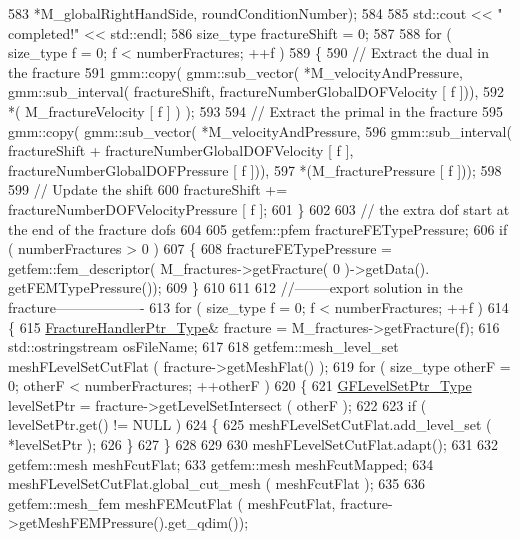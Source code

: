 \begin{DoxyCode}
583                   *M\_globalRightHandSide, roundConditionNumber);
584 
585     std::cout << \textcolor{stringliteral}{" completed!"} << std::endl;
586     size\_type fractureShift = 0;
587 
588     \textcolor{keywordflow}{for} ( size\_type f = 0; f < numberFractures; ++f )
589     \{ 
590         \textcolor{comment}{// Extract the dual in the fracture}
591         gmm::copy( gmm::sub\_vector( *M\_velocityAndPressure, gmm::sub\_interval( fractureShift, 
      fractureNumberGlobalDOFVelocity [ f ])),
592                   *( M\_fractureVelocity [ f ] ) );
593 
594         \textcolor{comment}{// Extract the primal in the fracture}
595         gmm::copy( gmm::sub\_vector( *M\_velocityAndPressure, 
596                                     gmm::sub\_interval( fractureShift + fractureNumberGlobalDOFVelocity [ f 
      ], fractureNumberGlobalDOFPressure [ f ])), 
597                    *(M\_fracturePressure [ f ]));
598 
599         \textcolor{comment}{// Update the shift}
600         fractureShift += fractureNumberDOFVelocityPressure [ f ];
601     \}
602 
603     \textcolor{comment}{// the extra dof start at the end of the fracture dofs}
604   
605     getfem::pfem fractureFETypePressure;
606     \textcolor{keywordflow}{if} ( numberFractures > 0 )
607     \{
608         fractureFETypePressure = getfem::fem\_descriptor( M\_fractures->getFracture( 0 )->getData().
      getFEMTypePressure());
609     \}
610 
611 
612     \textcolor{comment}{//--------export solution in the fracture-------------------}
613     \textcolor{keywordflow}{for} ( size\_type f = 0; f < numberFractures; ++f )
614     \{
615         \hyperlink{FractureHandler_8h_af23fb7a30aaff864bd42587af4f1e78a}{FractureHandlerPtr\_Type}& fracture = M\_fractures->getFracture(f);
616         std::ostringstream osFileName;
617 
618         getfem::mesh\_level\_set meshFLevelSetCutFlat ( fracture->getMeshFlat() );
619         \textcolor{keywordflow}{for} ( size\_type otherF = 0; otherF < numberFractures; ++otherF )
620         \{
621             \hyperlink{Core_8h_a036173458a8a25c7c03f8c76d97e9580}{GFLevelSetPtr\_Type} levelSetPtr = fracture->getLevelSetIntersect ( otherF );
622 
623             \textcolor{keywordflow}{if} ( levelSetPtr.get() != NULL )
624             \{
625                 meshFLevelSetCutFlat.add\_level\_set ( *levelSetPtr );
626             \}
627         \}
628 
629 
630         meshFLevelSetCutFlat.adapt();
631 
632         getfem::mesh meshFcutFlat;
633         getfem::mesh meshFcutMapped;
634         meshFLevelSetCutFlat.global\_cut\_mesh ( meshFcutFlat );
635 
636         getfem::mesh\_fem meshFEMcutFlat ( meshFcutFlat, fracture->getMeshFEMPressure().get\_qdim());

\end{DoxyCode}
